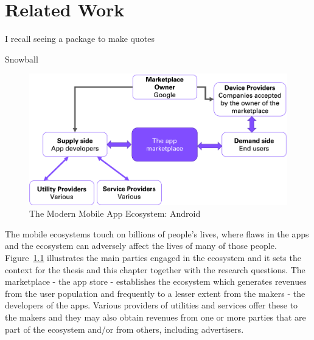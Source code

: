 \setchapterpreamble[u]{\margintoc}
\chapter{Related Work}
\label{chapter-related-work}
\epigraph{I recall seeing a package to make quotes}{Snowball} %


\begin{figure}[h!]
    \centering
    \includegraphics[width=0.9\linewidth]{images/my/android-app-ecosystem-main-players.png}
    \caption{The Modern Mobile App Ecosystem: Android}
    \label{fig:my_modern-mobile-app-ecosystem}
\end{figure}

The mobile ecosystems touch on billions of people's lives, where flaws in the apps and the ecosystem can adversely affect the lives of many of those people. Figure~\ref{fig:my_modern-mobile-app-ecosystem} illustrates the main parties engaged in the ecosystem %
and it sets the context for the thesis and this chapter together with the research questions. The marketplace - the app store - establishes the ecosystem which generates revenues from the user population and frequently to a lesser extent from the makers -  the developers of the apps. Various providers of utilities and services offer these to the makers and they may also obtain revenues from one or more parties that are part of the ecosystem and/or from others, including advertisers.

